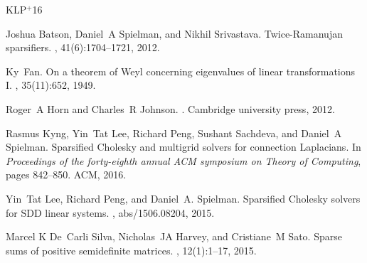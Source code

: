 \documentclass[11pt]{article}
\begin{document}
\newcommand{\etalchar}[1]{$^{#1}$}
\begin{thebibliography}{KLP{\etalchar{+}}16}

Joshua Batson, Daniel~A Spielman, and Nikhil Srivastava.
\newblock Twice-{Ramanujan} sparsifiers.
, 41(6):1704--1721, 2012.

Ky~Fan.
\newblock On a theorem of {Weyl} concerning eigenvalues of linear
  transformations {I}.
, 35(11):652, 1949.

Roger~A Horn and Charles~R Johnson.
.
\newblock Cambridge university press, 2012.

\bibitem[KLP{\etalchar{+}}16]{kyng2016sparsified}
Rasmus Kyng, Yin~Tat Lee, Richard Peng, Sushant Sachdeva, and Daniel~A
  Spielman.
\newblock Sparsified {Cholesky} and multigrid solvers for connection
  {Laplacians}.
\newblock In {\em Proceedings of the forty-eighth annual ACM symposium on
  Theory of Computing}, pages 842--850. ACM, 2016.

Yin~Tat Lee, Richard Peng, and Daniel~A. Spielman.
\newblock Sparsified {Cholesky} solvers for {SDD} linear systems.
, abs/1506.08204, 2015.

Marcel K De~Carli Silva, Nicholas~JA Harvey, and Cristiane~M Sato.
\newblock Sparse sums of positive semidefinite matrices.
, 12(1):1--17, 2015.

\end{thebibliography}
\end{document}
